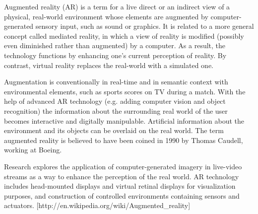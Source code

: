 Augmented reality (AR) is a term for a live direct or an indirect view of a physical, real-world environment whose elements are augmented by computer-generated sensory input, such as sound or graphics. It is related to a more general concept called mediated reality, in which a view of reality is modified (possibly even diminished rather than augmented) by a computer. As a result, the technology functions by enhancing one’s current perception of reality. By contrast, virtual reality replaces the real-world with a simulated one.

Augmentation is conventionally in real-time and in semantic context with environmental elements, such as sports scores on TV during a match. With the help of advanced AR technology (e.g. adding computer vision and object recognition) the information about the surrounding real world of the user becomes interactive and digitally manipulable. Artificial information about the environment and its objects can be overlaid on the real world. The term augmented reality is believed to have been coined in 1990 by Thomas Caudell, working at Boeing.

Research explores the application of computer-generated imagery in live-video streams as a way to enhance the perception of the real world. AR technology includes head-mounted displays and virtual retinal displays for visualization purposes, and construction of controlled environments containing sensors and actuators.  [http://en.wikipedia.org/wiki/Augmented_reality]